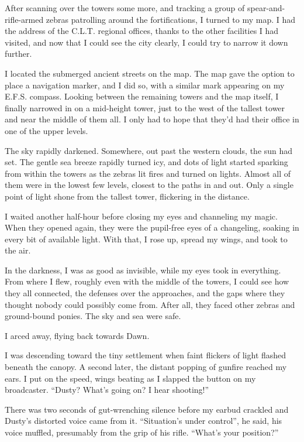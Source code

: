 After scanning over the towers some more, and tracking a group of spear-and-rifle-armed zebras patrolling around the fortifications, I turned to my map. I had the address of the C.L.T. regional offices, thanks to the other facilities I had visited, and now that I could see the city clearly, I could try to narrow it down further.

I located the submerged ancient streets on the map. The map gave the option to place a navigation marker, and I did so, with a similar mark appearing on my E.F.S. compass. Looking between the remaining towers and the map itself, I finally narrowed in on a mid-height tower, just to the west of the tallest tower and near the middle of them all. I only had to hope that they’d had their office in one of the upper levels.

The sky rapidly darkened. Somewhere, out past the western clouds, the sun had set. The gentle sea breeze rapidly turned icy, and dots of light started sparking from within the towers as the zebras lit fires and turned on lights. Almost all of them were in the lowest few levels, closest to the paths in and out. Only a single point of light shone from the tallest tower, flickering in the distance.

I waited another half-hour before closing my eyes and channeling my magic. When they opened again, they were the pupil-free eyes of a changeling, soaking in every bit of available light. With that, I rose up, spread my wings, and took to the air.

In the darkness, I was as good as invisible, while my eyes took in everything. From where I flew, roughly even with the middle of the towers, I could see how they all connected, the defenses over the approaches, and the gaps where they thought nobody could possibly come from. After all, they faced other zebras and ground-bound ponies. The sky and sea were safe.

I arced away, flying back towards Dawn.

I was descending toward the tiny settlement when faint flickers of light flashed beneath the canopy. A second later, the distant popping of gunfire reached my ears. I put on the speed, wings beating as I slapped the button on my broadcaster. “Dusty? What’s going on? I hear shooting!”

There was two seconds of gut-wrenching silence before my earbud crackled and Dusty’s distorted voice came from it. “Situation’s under control”, he said, his voice muffled, presumably from the grip of his rifle. “What’s your position?”

